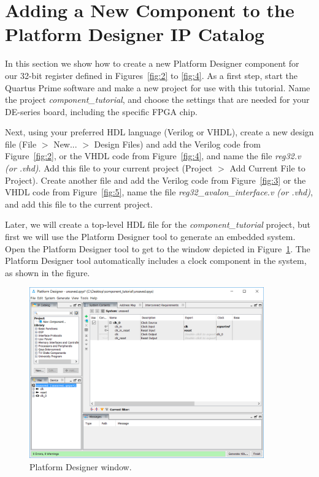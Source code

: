 \documentclass[11pt, twoside, pdftex]{article}
\begin{document}
\newpage
\section{Adding a New Component to the Platform Designer IP Catalog}

In this section we show how to create a new Platform Designer component for our 32-bit register defined
in Figures~\ref{fig:2} to \ref{fig:4}. As a first step, start the Quartus Prime software and
make a new project for use with this tutorial. Name the project {\it component\_tutorial}, and
choose the settings that are needed for your DE-series board, including the specific FPGA
chip.

Next, using your preferred HDL language (Verilog or VHDL), create a new design file {\sf (File $>$ New...
$>$ Design Files)} and add the Verilog code from Figure~\ref{fig:2}, or the VHDL code from Figure~\ref{fig:4}, and name the file {\it reg32.v (or .vhd)}. Add this file to your current project {\sf(Project $>$ Add Current File to Project)}. Create another file and add the Verilog code from Figure~\ref{fig:3} or the VHDL code from Figure~\ref{fig:5}, name the file {\it reg32\_avalon\_interface.v (or .vhd)}, and add this file to the current project.

Later, we will create a top-level HDL file for the {\it component\_tutorial} project, but
first we will use the Platform Designer tool to generate an embedded system.
Open the Platform Designer tool to get to the window depicted in Figure~\ref{fig:9}. The Platform Designer
tool automatically includes a clock component in the system, as shown in the figure. 

\begin{figure}[H]
   \begin{center}
        \includegraphics[width=0.9\textwidth]{figures/figure9.png}
   \end{center}
   \caption{Platform Designer window.}
	\label{fig:9}
\end{figure}
\end{document}
